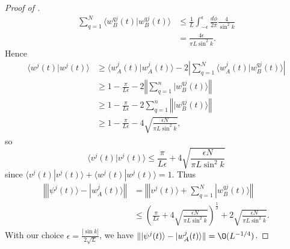 \documentclass[../thesis-main/thesis-main]{subfiles}
\begin{document}
\begin{proof}[Proof of {}]
\begin{align*}
\sum_{q=1}^{N}\langle w_{B}^{qj}(t)|w_{B}^{qj}(t)\rangle & \leq \frac{1}{L} \int_{-\epsilon}^{\epsilon}\frac{d\phi}{2\pi}\frac{4}{\sin^{2}k}\\
 & = \frac{4\epsilon}{\pi L\sin^{2}k}.\end{align*}
 Hence \begin{align*}
\langle w^{j}(t)|w^{j}(t)\rangle & \geq \langle w_{A}^{j}(t)|w_{A}^{j}(t)\rangle-2\left|\sum_{q=1}^{N}\langle w_{A}^{j}(t)|w_{B}^{qj}(t)\rangle\right|\\
 & \geq 1-\frac{\pi}{L\epsilon}-2\left\Vert \sum_{q=1}^{n}|w_{B}^{qj}(t)\rangle\right\Vert \\
 & \geq 1-\frac{\pi}{L\epsilon}-2\sum_{q=1}^{n}\left\Vert |w_{B}^{qj}(t)\rangle\right\Vert \\
 & \geq 1-\frac{\pi}{L\epsilon}-4\sqrt{\frac{\epsilon N}{\pi L\sin^{2}k}},\end{align*}
so
\begin{equation}
\langle v^{j}(t)|v^{j}(t)\rangle\leq\frac{\pi}{L\epsilon}+4\sqrt{\frac{\epsilon N}{\pi L\sin^{2}k}}
\end{equation}
since $\langle v^{j}(t)|v^{j}(t)\rangle+\langle w^{j}(t)|w^{j}(t)\rangle=1$.
Thus
\begin{align*}
\left\Vert |\psi^{j}(t)\rangle-|w_{A}^{j}(t)\rangle\right\Vert  & = \left\Vert |v^{j}(t)\rangle+\sum_{q=1}^{N}|w_{B}^{qj}(t)\rangle\right\Vert \\
 & \leq \left(\frac{\pi}{L\epsilon}+4\sqrt{\frac{\epsilon N}{\pi L\sin^{2}k}}\right)^{\frac{1}{2}}+2\sqrt{\frac{\epsilon N}{\pi L\sin^{2}k}}.
\end{align*}
With our choice $\epsilon=\frac{\left|\sin k\right|}{2\sqrt{L}}$,
we have $\norm{|\psi^{j}(t)\rangle-|w_{A}^{j}(t)\rangle} =\O(L^{-{1}/
{4}})$.


\end{proof}
\end{document}
